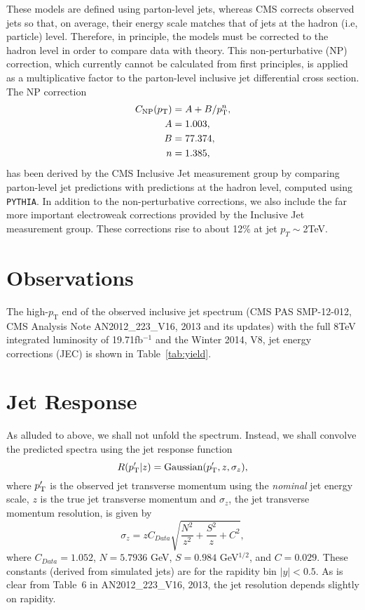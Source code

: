 \documentclass[aps,prd,preprint,nofootinbib]{revtex4}
\begin{document}
These models are defined using parton-level jets, whereas CMS corrects observed jets so that,
on average, their energy scale matches that of jets at the hadron (i.e, particle) level. Therefore, in principle, the models must be corrected
to the hadron level in order to compare data with theory. This non-perturbative (NP) correction,
which currently cannot be calculated from first principles, is applied as a multiplicative    
factor to the parton-level inclusive jet differential cross section. The NP correction 
\begin{align}
	C_\textrm{NP}(\textrm{$p_\textrm{T}$}) & = A + B / p_\textrm{T}^n, \nonumber\\
		 A &= 1.003, \nonumber\\
		 B &= 77.374, \nonumber\\
		 n &= 1.385,
\end{align}
has been derived by the CMS Inclusive Jet measurement group by
comparing parton-level jet predictions with predictions at the hadron level, computed
using  
{\tt PYTHIA}.  In addition to the non-perturbative corrections, we also include 
the far more important electroweak corrections provided by the Inclusive Jet measurement
group. These corrections rise to about 12\% at jet $p_T \sim$2TeV.

\section{Observations}
The high-$p_\textrm{T}$ end of the observed inclusive jet spectrum
(CMS PAS SMP-12-012, CMS Analysis Note AN2012\_223\_V16, 2013 and its
updates) with the full 8TeV integrated luminosity of 19.71fb$^{-1}$
and the Winter 2014, V8, jet energy corrections (JEC) is shown in 
Table~\ref{tab:yield}.




\section{Jet Response}
\label{sec:smearing}

As alluded to above, we shall not unfold the spectrum. Instead, we shall convolve the predicted spectra using
the jet response function 
\begin{equation}
R(\textrm{$p_\textrm{T}^\prime$}| z) = \textrm{Gaussian}(\textrm{$p_\textrm{T}^\prime$}, z,  \sigma_z),
\label{eq:R}
\end{equation}
where $\textrm{$p_\textrm{T}^\prime$}$ is the observed jet transverse momentum using the \emph{nominal}
jet energy scale, 
$z$ is the true jet transverse momentum and $\sigma_z$, the jet  transverse momentum resolution, is  
 given by 
\begin{equation}
	\sigma_z = z C_{Data} \sqrt{\frac{N^2}{z^2} + \frac{S^2}{z} + C^2}, 
	\label{eq:JER}
\end{equation}
where $C_{Data} = 1.052$, $N = 5.7936$ GeV, $S = 0.984$ GeV$^{1/2}$, and
$C = 0.029$. 
These constants
(derived from simulated jets) are for the rapidity bin $|y| < 0.5$.  As is clear from Table~6 in
AN2012\_223\_V16, 2013, the jet  resolution depends slightly on rapidity.
\end{document}

